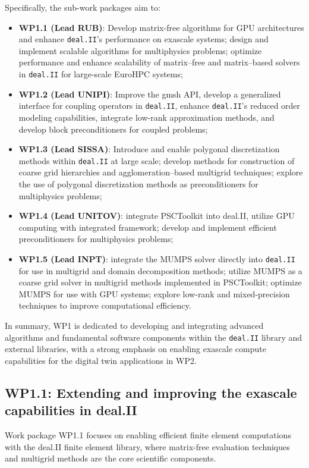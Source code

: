 \documentclass[a4paper,12pt, numbers]{article}
\newcommand{\dealii}{\texttt{deal.II}}
\begin{document}
	Specifically, the sub-work packages aim to:
	\begin{itemize}
		\item \textbf{WP1.1 (Lead RUB)}: Develop matrix-free algorithms for GPU
		architectures and enhance \dealii's performance on exascale systems; design and implement scalable algorithms for multiphysics problems; optimize performance and enhance scalability of matrix--free and matrix--based solvers in \dealii{} for large-scale EuroHPC systems;  
		\item \textbf{WP1.2 (Lead UNIPI)}: Improve the gmsh API, develop a generalized interface for coupling operators in \dealii{}, enhance \dealii's reduced order modeling capabilities, integrate low-rank approximation methods, and develop block preconditioners for coupled problems;
		\item \textbf{WP1.3 (Lead SISSA)}: Introduce and enable polygonal discretization methods within \dealii{} at large scale;  develop methods for construction of coarse grid hierarchies and agglomeration--based multigrid techniques; explore the use of polygonal discretization methods as preconditioners for multiphysics problems;
		\item \textbf{WP1.4 (Lead UNITOV)}: integrate PSCToolkit into deal.II, utilize GPU computing with integrated framework; develop and implement efficient preconditioners for multiphysics problems;
		\item \textbf{WP1.5 (Lead INPT)}: integrate the MUMPS solver directly into \dealii{} for use in multigrid and domain decomposition methods; utilize MUMPS as a coarse grid solver in multigrid methods implemented in PSCToolkit; optimize MUMPS for use with GPU systems; explore low-rank and mixed-precision techniques to improve computational efficiency.
	\end{itemize}
	
	In summary, WP1 is dedicated to developing and integrating advanced algorithms and fundamental software components within the \dealii{} library and external libraries, with a strong emphasis on enabling exascale compute capabilities for the digital twin applications in WP2.
	
	
	\subsection{WP1.1: Extending and improving the exascale capabilities in deal.II} %

Work package WP1.1 focuses on enabling efficient finite element computations
with the deal.II finite element library, where matrix-free evaluation
techniques and multigrid methods are the core scientific components.
\end{document}
